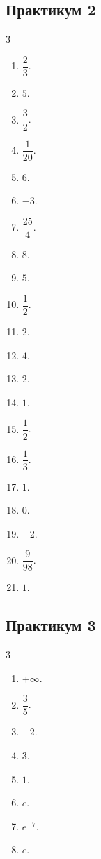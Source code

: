 \subsection*{Практикум 2}
\begin{multicols}{3}
\begin{enumerate}
\item $\dfrac23$.
\item $5$.
\item $\dfrac32$.
\item $\dfrac1{20}$.
\item $6$.
\item $-3$.
\item $\dfrac{25}{4}$.
\item $8$.
\item $5$.
\item $\dfrac12$.
\item $2$.
\item $4$.
\item $2$.
\item $1$.
\item $\dfrac12$.
\item $\dfrac13$.
\item $1$.
\item $0$.
\item $-2$.
\item $\dfrac9{98}$.
\item $1$.
\end{enumerate}
\end{multicols}
\subsection*{Практикум 3}
\begin{multicols}{3}
\begin{enumerate}
\item $+\infty$.
\item $\dfrac35$.
\item $-2$.
\item $3$.
\item $1$.
\item $e$.
\item $e^{-7}$.
\item $e$.
\end{enumerate}
\end{multicols}
